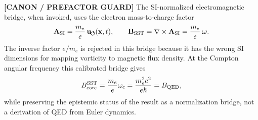 \documentclass[11pt]{article}
\theoremstyle{definition}
\theoremstyle{plain}
\theoremstyle{remark}
\newcommand{\uswirl}{\mathbf{u}_{\!\boldsymbol{\circlearrowleft}}}
\begin{document}
        \textbf{[CANON / PREFACTOR GUARD]} The SI-normalized electromagnetic bridge, when invoked, uses the electron mass-to-charge factor
        \begin{align}
            \mathbf{A}_{\rm SI}
            =
            \frac{m_e}{e}\,\uswirl(\mathbf{x},t),
            \qquad
            \mathbf{B}_{\rm SST}
            =
            \nabla\times\mathbf{A}_{\rm SI}
            =
            \frac{m_e}{e}\,\boldsymbol{\omega}.
            \label{eq:canonical_em_prefactor_guard}
        \end{align}
        The inverse factor \(e/m_e\) is rejected in this bridge because it has the wrong SI dimensions for mapping vorticity to magnetic flux density. At the Compton angular frequency this calibrated bridge gives
        \begin{align}
            B_{\rm core}^{\rm SST}
            =
            \frac{m_e}{e}\omega_c
            =
            \frac{m_e^2c^2}{e\hbar}
            =
            B_{\rm QED},
            \label{eq:canonical_qed_field_guard}
        \end{align}
        while preserving the epistemic status of the result as a normalization bridge, not a derivation of QED from Euler dynamics.
\end{document}
